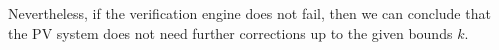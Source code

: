 \documentclass[review]{elsarticle}
\begin{document}
Nevertheless, if the verification engine does not fail, then we can conclude that the PV system does not need further corrections up to the given bounds $k$.
%
\end{document}
